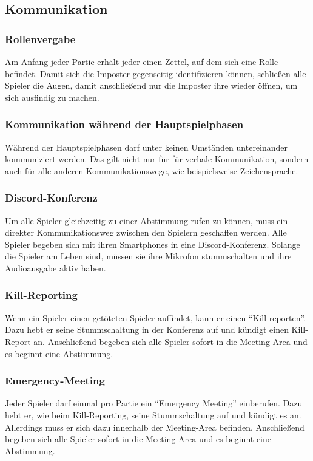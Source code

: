 \subsection{Kommunikation}
\subsubsection{Rollenvergabe}
Am Anfang jeder Partie erhält jeder einen Zettel, auf dem sich eine Rolle
befindet. Damit sich die Imposter gegenseitig identifizieren können, schließen
alle Spieler die Augen, damit anschließend nur die Imposter ihre wieder öffnen,
um sich ausfindig zu machen.
\subsubsection{Kommunikation während der Hauptspielphasen}
Während der Hauptspielphasen darf unter keinen Umständen untereinander
kommuniziert werden. Das gilt nicht nur für für verbale Kommunikation,
sondern auch für alle anderen Kommunikationswege, wie beispielsweise
Zeichensprache.
\subsubsection{Discord-Konferenz}
Um alle Spieler gleichzeitig zu einer Abstimmung rufen zu können, muss ein
direkter Kommunikationsweg zwischen den Spielern geschaffen werden.
Alle Spieler begeben sich mit ihren Smartphones in eine Discord-Konferenz.
Solange die Spieler am Leben sind, müssen sie ihre Mikrofon stummschalten und
ihre Audioausgabe aktiv haben.

\subsubsection{Kill-Reporting}
Wenn ein Spieler einen getöteten Spieler auffindet, kann er einen
``Kill reporten''. Dazu hebt er seine Stummschaltung in der Konferenz auf und
kündigt einen Kill-Report an. Anschließend begeben sich alle Spieler sofort in
die Meeting-Area und es beginnt eine Abstimmung.

\subsubsection{Emergency-Meeting}
Jeder Spieler darf einmal pro Partie ein ``Emergency Meeting'' einberufen. Dazu
hebt er, wie beim Kill-Reporting, seine Stummschaltung auf und kündigt es an.
Allerdings muss er sich dazu innerhalb der Meeting-Area befinden.
Anschließend begeben sich alle Spieler sofort in
die Meeting-Area und es beginnt eine Abstimmung.

